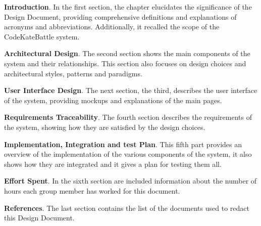 \textbf{Introduction}. In the first section, the chapter elucidates the significance of the Design 
Document, providing comprehensive definitions and explanations of acronyms and abbreviations. Additionally, it recalled the scope of the CodeKateBattle system.

\textbf{Architectural Design}. The second section shows the main components of the system and their relationships. This section also focuses on design choices and architectural styles, patterns and paradigms.

\textbf{User Interface Design}. The next section, the third, describes the user interface of the system, providing mockups and explanations of the main pages.

\textbf{Requirements Traceability}. The fourth section describes the requirements of the system, showing how they are satisfied by the design choices.

\textbf{Implementation, Integration and test Plan}. This fifth part provides an overview of the implementation of the various components of the system, it also shows how they are integrated and it gives a plan for testing them all.

\textbf{Effort Spent}. In the sixth section are included information about the number of hours each group member has worked for this document.

\textbf{References}. The last section contains the list of the documents used to redact this Design Document.
 
